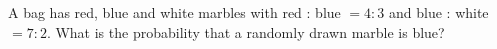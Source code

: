 A bag has red, blue and white marbles with red : blue $=4:3$ and blue : white $=7:2$. What is the probability that a randomly drawn marble is blue?
